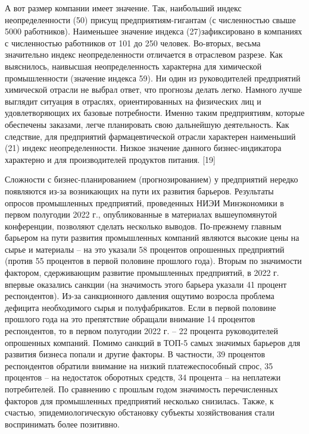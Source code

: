 \documentclass[14pt,a4paper]{article}
\begin{document}
    А вот размер компании имеет значение.
    Так, наибольший индекс неопределенности (50) присущ предприятиям-гигантам (с численностью свыше 5000 работников).
    Наименьшее значение индекса (27)зафиксировано в компаниях с численностью работников от 101 до 250 человек.
    Во-вторых, весьма значительно индекс неопределенности отличается в отраслевом разрезе.
    Как выяснилось, наивысшая неопределенность характерна для химической промышленности (значение индекса 59).
    Ни один из руководителей предприятий химической отрасли не выбрал ответ, что прогнозы делать легко.
    Намного лучше выглядит ситуация в отраслях, ориентированных на физических лиц и удовлетворяющих их базовые потребности.
    Именно таким предприятиям, которые обеспечены заказами, легче планировать свою дальнейшую деятельность.
    Как следствие, для предприятий фармацевтической отрасли характерен наименьший (21) индекс неопределенности.
    Низкое значение данного бизнес-индикатора характерно и для производителей продуктов питания. [19]
    \par
    Сложности с бизнес-планированием (прогнозированием) у предприятий нередко появляются из-за возникающих на пути их развития барьеров.
    Результаты опросов промышленных предприятий, проведенных НИЭИ Минэкономики в первом полугодии 2022 г., опубликованные в материалах вышеупомянутой конференции, позволяют сделать несколько выводов.
    По-прежнему главным барьером на пути развития промышленных компаний являются высокие цены на сырье и материалы – на это указали 58 процентов опрошенных предприятий (против 55 процентов в первой половине прошлого года).
    Вторым по значимости фактором, сдерживающим развитие промышленных предприятий, в 2022 г. впервые оказались санкции (на значимость этого барьера указали 41 процент респондентов).
    Из-за санкционного давления ощутимо возросла проблема дефицита необходимого сырья и полуфабрикатов.
    Если в первой половине прошлого года на это препятствие обращали внимание 14 процентов респондентов, то в первом полугодии 2022 г. – 22 процента руководителей опрошенных компаний.
    Помимо санкций в ТОП-5 самых значимых барьеров для развития бизнеса попали и другие факторы.
    В частности, 39 процентов респондентов обратили внимание на низкий платежеспособный спрос, 35 процентов – на недостаток оборотных средств, 34 процента – на неплатежи потребителей.
    По сравнению с прошлым годом значимость перечисленных факторов для промышленных предприятий несколько снизилась.
    Также, к счастью, эпидемиологическую обстановку субъекты хозяйствования стали воспринимать более позитивно.
\end{document}
